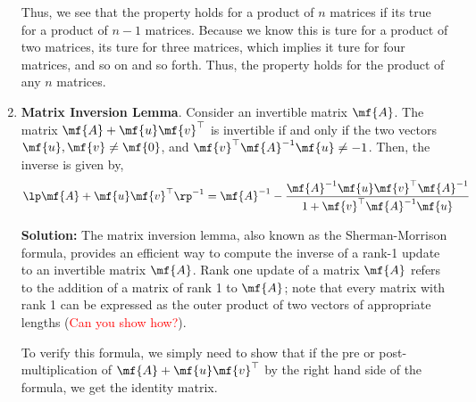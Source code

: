 \begin{enumerate}
\begin{boxedstuff}
        Thus, we see that the property holds for a product of $n$ matrices if its true for a product of $n-1$ matrices. Because we know this is ture for a product of two matrices, its ture for three matrices, which implies it ture for four matrices, and so on and so forth. Thus, the property holds for the product of any $n$ matrices.
    \end{boxedstuff}

    \item \textbf{Matrix Inversion Lemma}. Consider an invertible matrix $\mf{A}$. The matrix $\mf{A} + \mf{u}\mf{v}^\top$ is invertible if and only if the two vectors $\mf{u}, \mf{v} \neq \mf{0}$, and $\mf{v}^\top\mf{A}^{-1}\mf{u} \neq -1$. Then, the inverse is given by,
	\[
	\lp \mf{A} + \mf{u}\mf{v}^\top\rp^{-1} = \mf{A}^{-1} - \frac{\mf{A}^{-1}\mf{u}\mf{v}^\top\mf{A}^{-1}}{1 + \mf{v}^{\top}\mf{A}^{-1}\mf{u}}
	\]
    \begin{boxedstuff}
        \vspace{4mm}
        \textbf{Solution:} The matrix inversion lemma, also known as the Sherman-Morrison formula, provides an efficient way to compute the inverse of a rank-1 update to an invertible matrix $\mf{A}$. Rank one update of a matrix $\mf{A}$ refers to the addition of a matrix of rank 1 to $\mf{A}$; note that every matrix with rank 1 can be expressed as the outer product of two vectors of appropriate lengths (\textcolor{red}{Can you show how?}).

        To verify this formula, we simply need to show that if the pre or post-multiplication of $\mf{A} + \mf{u}\mf{v}^\top$ by the right hand side of the formula, we get the identity matrix.


\end{boxedstuff}
\end{enumerate}
